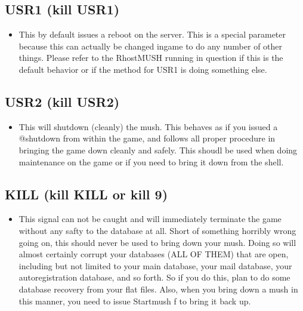 \documentclass[letterpaper,10pt,english]{sphinxmanual}
\begin{document}
\subsection{USR1 (kill \sphinxhyphen{}USR1)}
\label{\detokenize{maintenance:usr1-kill-usr1}}\begin{itemize}
\item {} 
\sphinxAtStartPar
This by default issues a reboot on the server.  This is a special parameter
because this can actually be changed in\sphinxhyphen{}game to do any number of other
things.  Please refer to the RhostMUSH running in question if this is
the default behavior or if the method for USR1 is doing something else.

\end{itemize}


\subsection{USR2 (kill \sphinxhyphen{}USR2)}
\label{\detokenize{maintenance:usr2-kill-usr2}}\begin{itemize}
\item {} 
\sphinxAtStartPar
This will shutdown (cleanly) the mush.  This behaves as if you issued
a @shutdown from within the game, and follows all proper procedure
in bringing the game down cleanly and safely.  This shoudl be used
when doing maintenance on the game or if you need to bring it down
from the shell.

\end{itemize}


\subsection{KILL (kill \sphinxhyphen{}KILL or kill \sphinxhyphen{}9)}
\label{\detokenize{maintenance:kill-kill-kill-or-kill-9}}\begin{itemize}
\item {} 
\sphinxAtStartPar
This signal can not be caught and will immediately terminate the game
without any safty to the database at all.  Short of something horribly
wrong going on, this should never be used to bring down your mush.
Doing so will almost certainly corrupt your databases (ALL OF THEM)
that are open, including but not limited to your main database, your
mail database, your autoregistration database, and so forth.  So if
you do this, plan to do some database recovery from your flat files.
Also, when you bring down a mush in this manner, you need to issue
Startmush \sphinxhyphen{}f to bring it back up.

\end{itemize}
\end{document}
